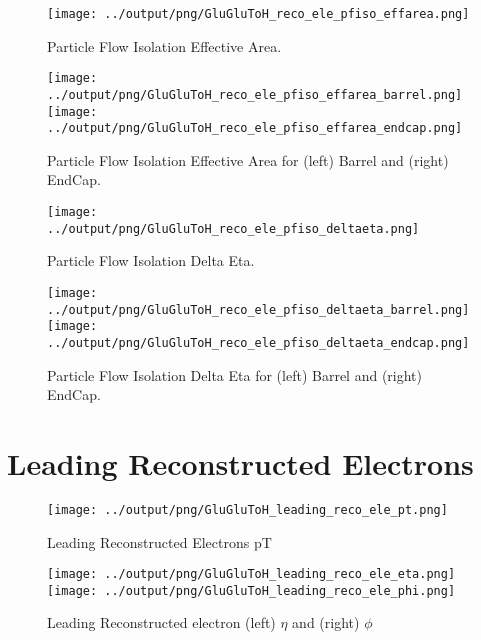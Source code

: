 \documentclass[11pt]{book}
\begin{document}
\begin{figure}[ht]
\centering
\texttt{[image: ../output/png/GluGluToH\_reco\_ele\_pfiso\_effarea.png]}
\caption{Particle Flow Isolation Effective Area.}
\label{fig:gluglu_reco_ele_pfiso_effarea}
\end{figure}

\begin{figure}[ht]
\centering
\texttt{[image: ../output/png/GluGluToH\_reco\_ele\_pfiso\_effarea\_barrel.png]}
\texttt{[image: ../output/png/GluGluToH\_reco\_ele\_pfiso\_effarea\_endcap.png]}
\caption{Particle Flow Isolation Effective Area for (left) Barrel and (right) EndCap.}
\label{fig:gluglu_reco_ele_pfiso_effarea_regions}
\end{figure}

\begin{figure}[ht]
\centering
\texttt{[image: ../output/png/GluGluToH\_reco\_ele\_pfiso\_deltaeta.png]}
\caption{Particle Flow Isolation Delta Eta.}
\label{fig:gluglu_reco_ele_pfiso_deltaeta}
\end{figure}

\begin{figure}[ht]
\centering
\texttt{[image: ../output/png/GluGluToH\_reco\_ele\_pfiso\_deltaeta\_barrel.png]}
\texttt{[image: ../output/png/GluGluToH\_reco\_ele\_pfiso\_deltaeta\_endcap.png]}
\caption{Particle Flow Isolation Delta Eta for (left) Barrel and (right) EndCap.}
\label{fig:gluglu_reco_ele_pfiso_deltaeta_regions}
\end{figure}

\clearpage


\section{Leading Reconstructed Electrons}

\begin{figure}[ht]
\centering
\texttt{[image: ../output/png/GluGluToH\_leading\_reco\_ele\_pt.png]}
\caption{Leading Reconstructed Electrons pT}
\label{fig:gluglu_leading_reco_ele_pt}
\end{figure}

\begin{figure}[ht]
\centering
\texttt{[image: ../output/png/GluGluToH\_leading\_reco\_ele\_eta.png]}
\texttt{[image: ../output/png/GluGluToH\_leading\_reco\_ele\_phi.png]}
\caption{Leading Reconstructed electron (left) $\eta$ and (right) $\phi$}
\label{fig:gluglu_leading_reco_ele_eta_phi}
\end{figure}


 
\end{document}
